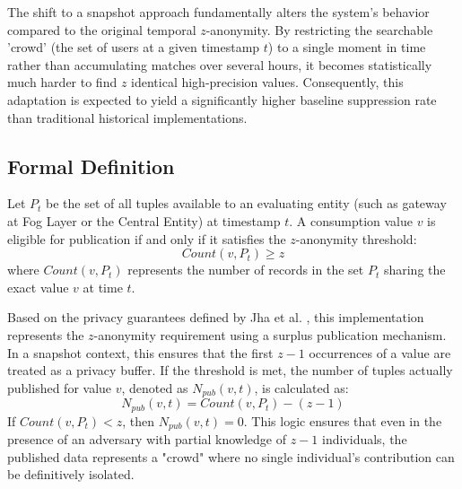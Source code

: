 The shift to a snapshot approach fundamentally alters the system's behavior compared to the original temporal $z$-anonymity. By restricting the searchable 'crowd' (the set of users at a given timestamp $t$) to a single moment in time rather than accumulating matches over several hours, it becomes statistically much harder to find $z$ identical high-precision values. Consequently, this adaptation is expected to yield a significantly higher baseline suppression rate than traditional historical implementations.
 



\subsection{Formal Definition}
Let $P_t$ be the set of all tuples available to an evaluating entity (such as gateway at Fog Layer or the Central Entity) at timestamp $t$. A consumption value $v$ is eligible for publication if and only if it satisfies the $z$-anonymity threshold:
\begin{equation}
    Count(v, P_t) \geq z
\end{equation}
where $Count(v, P_t)$ represents the number of records in the set $P_t$ sharing the exact value $v$ at time $t$. 


Based on the privacy guarantees defined by Jha et al. \cite{zanonDataStreams}, this implementation represents the $z$-anonymity requirement using a surplus publication mechanism. In a snapshot context, this ensures that the first $z-1$ occurrences of a value are treated as a privacy buffer. If the threshold is met, the number of tuples actually published for value $v$, denoted as $N_{pub}(v, t)$, is calculated as:
\begin{equation}
    N_{pub}(v, t) = Count(v, P_t) - (z - 1)
\end{equation}
If $Count(v, P_t) < z$, then $N_{pub}(v, t) = 0$. This logic ensures that even in the presence of an adversary with partial knowledge of $z-1$ individuals, the published data represents a "crowd" where no single individual's contribution can be definitively isolated.
